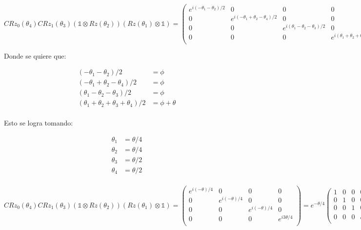 \begin{equation}
    CRz_0(\theta_4) CRz_1(\theta_3) (\mathds{1} \otimes Rz(\theta_2)) (Rz(\theta_1) \otimes \mathds{1}) =
    \begin{pmatrix}
        e^{i(-\theta_1 - \theta_2)/2} & 0 & 0 & 0 \\
        0 & e^{i(-\theta_1+\theta_2-\theta_4)/2} & 0 & 0 \\
        0 & 0 & e^{i(\theta_1 - \theta_2 - \theta_3)/2} & 0 \\
        0 & 0 & 0 & e^{i(\theta_1 + \theta_2 + \theta_3 + \theta_4)/2} \\
    \end{pmatrix}
\end{equation}

Donde se quiere que:

\begin{align}
    (-\theta_1 - \theta_2)/2 &= \phi \\
    (-\theta_1+\theta_2-\theta_4)/2 &= \phi \\
    (\theta_1 - \theta_2 - \theta_3)/2 &= \phi \\
    (\theta_1 + \theta_2 + \theta_3 + \theta_4)/2 &= \phi + \theta \\
\end{align}

Esto se logra tomando:

\begin{align}
    \theta_1 &= \theta/4\\
    \theta_2 &= \theta/4\\
    \theta_3 &= \theta/2\\
    \theta_4 &= \theta/2\\
\end{align}

\begin{equation}
    CRz_0(\theta_4) CRz_1(\theta_3) (\mathds{1} \otimes Rz(\theta_2)) (Rz(\theta_1) \otimes \mathds{1}) =
    \begin{pmatrix}
        e^{i(-\theta)/4} & 0 & 0 & 0 \\
        0 & e^{i(-\theta)/4} & 0 & 0 \\
        0 & 0 & e^{i(- \theta)/4} & 0 \\
        0 & 0 & 0 & e^{i 3\theta/4} \\
    \end{pmatrix} =
    e^{- \theta/4} \begin{pmatrix}
        1 & 0 & 0 & 0 \\
        0 & 1 & 0 & 0 \\
        0 & 0 & 1 & 0 \\
        0 & 0 & 0 & e^{i \theta} \\
    \end{pmatrix}
\end{equation}


